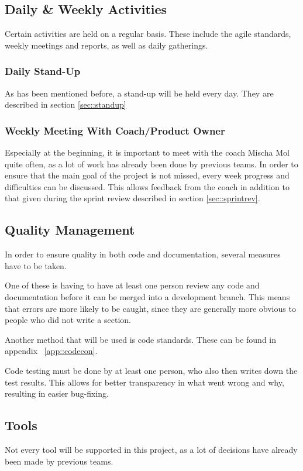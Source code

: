 \subsection{Daily \& Weekly Activities}
Certain activities are held on a regular basis.
These include the agile standards, weekly meetings and reports, as well as daily gatherings.

\subsubsection{Daily Stand-Up}
As has been mentioned before, a stand-up will be held every day.
They are described in section \ref{sec::standup}
\subsubsection{Weekly Meeting With Coach/Product Owner}
Especially at the beginning, it is important to meet with the coach Mischa Mol quite often, as a lot of work has already been done by previous teams.
In order to ensure that the main goal of the project is not missed, every week progress and difficulties can be discussed.
This allows feedback from the coach in addition to that given during the sprint review described in section \ref{sec::sprintrev}.

\subsection{Quality Management}
In order to ensure quality in both code and documentation, several measures have to be taken.

One of these is having to have at least one person review any code and documentation before it can be merged into a development branch.
This means that errors are more likely to be caught, since they are generally more obvious to people who did not write a section.

Another method that will be used is code standards. 
These can be found in appendix ~\ref{app::codecon}.

Code testing must be done by at least one person, who also then writes down the test results.
This allows for better transparency in what went wrong and why, resulting in easier bug-fixing.
\newpage

\subsection{Tools}
Not every tool will be supported in this project, as a lot of decisions have already been made by previous teams.

